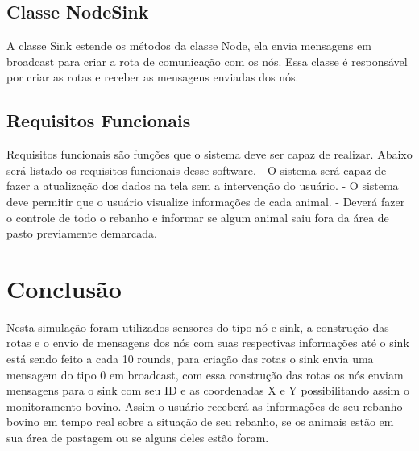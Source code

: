 \documentclass[12pt]{article}
\begin{document}
\subsection{Classe NodeSink}
A classe Sink estende os métodos da classe Node, ela envia mensagens em broadcast para criar a rota de comunicação com os nós. Essa classe é responsável por criar as rotas e receber as mensagens enviadas dos nós.

\subsection{Requisitos Funcionais}
Requisitos funcionais são funções que o sistema deve ser capaz de realizar. Abaixo será listado os requisitos funcionais desse software.
- O sistema será capaz de fazer a atualização dos dados na tela sem a intervenção do usuário.
- O sistema deve permitir que o usuário visualize informações de cada animal.
- Deverá fazer o controle de todo o rebanho e informar se algum animal saiu fora da área de pasto previamente demarcada.

\section{Conclusão}
Nesta simulação foram utilizados sensores do tipo nó e sink, a construção das rotas e o envio de mensagens dos nós com suas respectivas informações até o sink está sendo feito a cada 10 rounds, para criação das rotas o sink envia uma mensagem do tipo 0 em broadcast, com essa construção das rotas os nós enviam mensagens para o sink com seu ID e as coordenadas X e Y possibilitando assim o monitoramento bovino. Assim o usuário receberá as informações de seu rebanho bovino em tempo real sobre a situação de seu rebanho, se os animais estão em sua área de pastagem ou se alguns deles estão foram.



\end{document}
